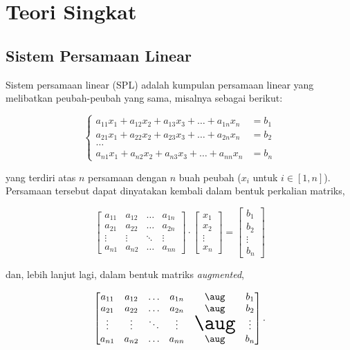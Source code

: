\section{Teori Singkat}
\subsection{Sistem Persamaan Linear}
Sistem persamaan linear (SPL) adalah kumpulan persamaan linear yang melibatkan peubah-peubah yang sama, misalnya sebagai berikut:

\[\begin{cases}
    a_{11}x_{1} + a_{12}x_{2} + a_{13}x_{3} + \ldots + a_{1n}x_{n} &= b_1 \\ 
    a_{21}x_{1} + a_{22}x_{2} + a_{23}x_{3} + \ldots + a_{2n}x_{n} &= b_2 \\
    \ldots \\
    a_{n1}x_{1} + a_{n2}x_{2} + a_{n3}x_{3} + \ldots + a_{nn}x_{n} &= b_n
\end{cases}\]

yang terdiri atas $n$ persamaan dengan $n$ buah peubah ($x_{i}$ untuk $i \in [1, n]$). Persamaan tersebut dapat dinyatakan kembali dalam bentuk perkalian matriks,

\begin{equation*}    
    \begin{bmatrix}
        a_{11} & a_{12} & \ldots & a_{1n} \\
        a_{21} & a_{22} & \ldots & a_{2n} \\
        \vdots & \vdots & \ddots & \vdots \\
        a_{n1} & a_{n2} & \ldots & a_{nn} 
    \end{bmatrix} \cdot 
    \begin{bmatrix}
        x_1\\
        x_2\\
        \vdots\\
        x_n
    \end{bmatrix}
    =
    \begin{bmatrix}
        b_1\\
        b_2\\
        \vdots\\
        b_n
    \end{bmatrix}
\end{equation*}

dan, lebih lanjut lagi, dalam bentuk matriks \textit{augmented},

\begin{equation*}
    \begin{bmatrix}
        a_{11} & a_{12} & \ldots & a_{1n} & \aug & b_1    \\
        a_{21} & a_{22} & \ldots & a_{2n} & \aug & b_2    \\
        \vdots & \vdots & \ddots & \vdots & \text{\huge$\aug$} & \vdots \\
        a_{n1} & a_{n2} & \ldots & a_{nn} & \aug & b_n 
    \end{bmatrix}.
\end{equation*}

